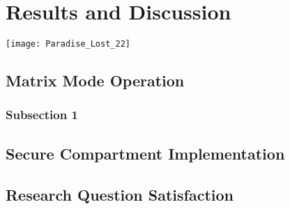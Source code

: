 
\chapter{Results and Discussion} %

\texttt{[image: Paradise\_Lost\_22]}

\label{Chapter 7} %


\section{Matrix Mode Operation}


\subsection{Subsection 1}



\section{Secure Compartment Implementation}


\section{Research Question Satisfaction}

